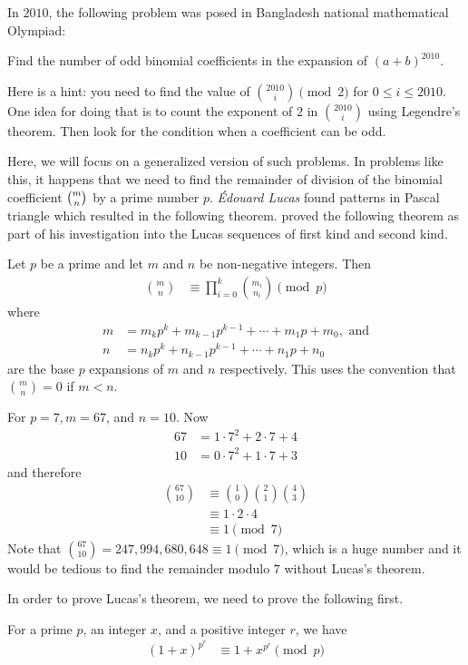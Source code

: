 \documentclass[12pt]{subfile}
\begin{document}
In $2010$, the following problem was posed in Bangladesh national mathematical Olympiad:
	\begin{problem}
		Find the number of odd binomial coefficients in the expansion of $(a+b)^{2010}$.
	\end{problem}
Here is a hint: you need to find the value of $\binom{2010}{i}\pmod2$ for $0\leq i\leq2010$. One idea for doing that is to count the exponent of $2$ in $\binom{2010}{i}$ using Legendre's theorem. Then look for the condition when a coefficient can be odd.

Here, we will focus on a generalized version of such problems. In problems like this, it happens that we need to find the remainder of division of the binomial coefficient $\tbinom{m}{n}$ by a prime number $p$. \textit{\'{E}douard Lucas} found patterns in Pascal triangle which resulted in the following theorem. \textcite[Page $230$, $\S$ XXI]{lucas_1878_2} proved the following theorem as part of his investigation into the Lucas sequences of first kind and second kind.
	\begin{theorem}
		Let $p$ be a prime and let $m$ and $n$ be non-negative integers. Then
			\begin{align*}
				\binom{m}{n}
					& \equiv\prod_{i=0}^k\binom{m_i}{n_i}\pmod p
			\end{align*}
		where
			\begin{align*}
				m & =m_kp^k+m_{k-1}p^{k-1}+\cdots +m_1p+m_0, \text{ and}\\
				n & =n_kp^k+n_{k-1}p^{k-1}+\cdots +n_1p+n_0
			\end{align*}
		are the base $p$ expansions of $m$ and $n$ respectively. This uses the convention that $\binom{m}{n}=0$ if $m<n$.
	\end{theorem}

	\begin{example}
		For $p=7, m=67$, and $n=10$. Now
			\begin{align*}
				67
					& = 1 \cdot 7^2 + 2 \cdot 7 + 4\\
				10
					& = 0 \cdot 7^2 + 1 \cdot 7 + 3
			\end{align*}
		and therefore
			\begin{align*}
				\binom{67}{10}
					& \equiv\binom{1}{0}\binom{2}{1}\binom{4}{3}\\
					& \equiv 1 \cdot 2 \cdot 4\\
					& \equiv 1 \pmod 7
			\end{align*}
		Note that $\binom{67}{10} = 247,994,680,648 \equiv 1 \pmod 7$, which is a huge number and it would be tedious to find the remainder modulo $7$ without Lucas's theorem.
	\end{example}
In order to prove Lucas's theorem, we need to prove the following first.
	\begin{lemma}
		For a prime $p$, an integer $x$, and a positive integer $r$, we have
			\begin{align*}
				(1+x)^{p^r}
					& \equiv 1+x^{p^r}\pmod{p}
			\end{align*}
	\end{lemma}
\end{document}
